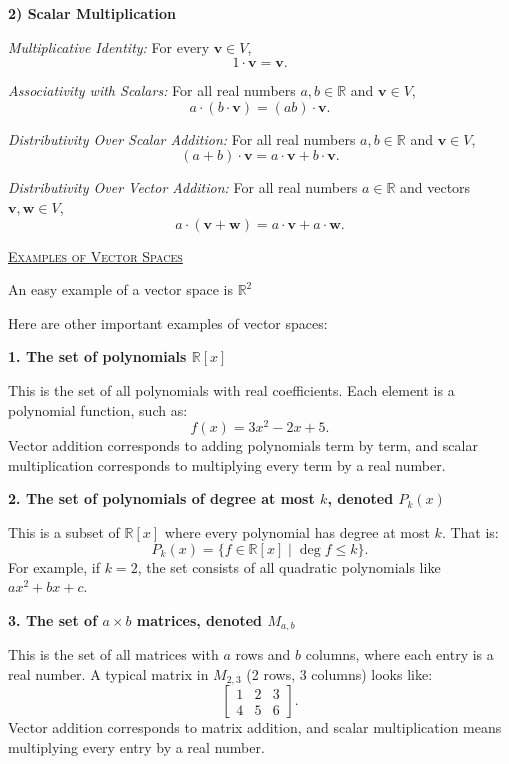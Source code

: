 \documentclass{article}
\begin{document}
\medskip
\noindent \textbf{2) Scalar Multiplication} 

\medskip
\emph{Multiplicative Identity:} For every \( \mathbf{v} \in V \),
\[
1 \cdot \mathbf{v} = \mathbf{v}.
\]

\emph{Associativity with Scalars:} For all real numbers \( a, b \in \mathbb{R} \) and \( \mathbf{v} \in V \),
\[
a \cdot (b \cdot \mathbf{v}) = (ab) \cdot \mathbf{v}.
\]

\emph{Distributivity Over Scalar Addition:} For all real numbers \( a, b \in \mathbb{R} \) and \( \mathbf{v} \in V \),
\[
(a + b) \cdot \mathbf{v} = a \cdot \mathbf{v} + b \cdot \mathbf{v}.
\]

\emph{Distributivity Over Vector Addition:} For all real numbers \( a \in \mathbb{R} \) and vectors \( \mathbf{v}, \mathbf{w} \in V \),
\[
a \cdot (\mathbf{v} + \mathbf{w}) = a \cdot \mathbf{v} + a \cdot \mathbf{w}.
\]

\begin{center}
    \textsc{\underline{Examples of Vector Spaces}}
\end{center}

An easy example of a vector space is $\mathbb{R}^2$

Here are other important examples of vector spaces:

\medskip
\noindent \textbf{1. The set of polynomials \( \mathbb{R}[x] \)}  

This is the set of all polynomials with real coefficients. Each element is a polynomial function, such as:
\[
f(x) = 3x^2 - 2x + 5.
\]
Vector addition corresponds to adding polynomials term by term, and scalar multiplication corresponds to multiplying every term by a real number.

\medskip
\noindent \textbf{2. The set of polynomials of degree at most \( k \), denoted \( P_k(x) \)}  

This is a subset of \( \mathbb{R}[x] \) where every polynomial has degree at most \( k \). That is:
\[
P_k(x) = \{ f \in \mathbb{R}[x] \mid \deg f \leq k \}.
\]
For example, if \( k = 2 \), the set consists of all quadratic polynomials like \( ax^2 + bx + c \).

\medskip
\noindent \textbf{3. The set of \( a \times b \) matrices, denoted \( M_{a,b} \)}  

This is the set of all matrices with \( a \) rows and \( b \) columns, where each entry is a real number. A typical matrix in \( M_{2,3} \) (2 rows, 3 columns) looks like:
\[
\begin{bmatrix}
1 & 2 & 3 \\
4 & 5 & 6
\end{bmatrix}.
\]
Vector addition corresponds to matrix addition, and scalar multiplication means multiplying every entry by a real number.
\end{document}
